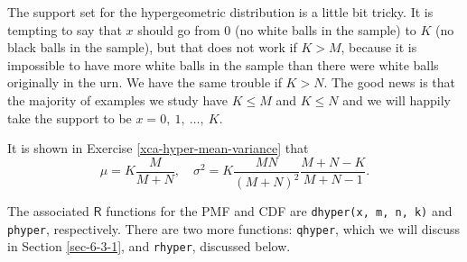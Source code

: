 \documentclass[captions=tableheading]{scrbook}
\begin{document}
The support set for the hypergeometric distribution is a little bit tricky. It is tempting to say that \(x\) should go from 0 (no white balls in the sample) to \(K\) (no black balls in the sample), but that does not work if \(K>M\), because it is impossible to have more white balls in the sample than there were white balls originally in the urn. We have the same trouble if \(K>N\). The good news is that the majority of examples we study have \(K\leq M\) and \(K\leq N\) and we will happily take the support to be \(x=0,\ 1,\ \ldots,\ K\). 

It is shown in Exercise \ref{xca-hyper-mean-variance} that
\begin{equation}
\mu=K\frac{M}{M+N},\quad\sigma^{2}=K\frac{MN}{(M+N)^{2}}\frac{M+N-K}{M+N-1}.
\end{equation}

The associated \(\mathsf{R}\) functions for the PMF and CDF are \texttt{dhyper(x, m, n, k)} and \texttt{phyper}, respectively. There are two more functions: \texttt{qhyper}, which we will discuss in Section \ref{sec-6-3-1}, and \texttt{rhyper}, discussed below.
\end{document}
